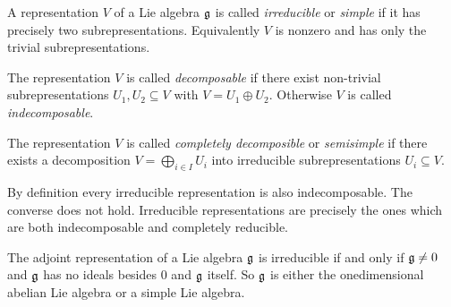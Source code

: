 \begin{defi}
 A representation $V$ of a Lie algebra $\mathfrak{g}$ is called \emph{irreducible} or \emph{simple} if it has precisely two subrepresentations. Equivalently $V$ is nonzero and has only the trivial subrepresentations.
 
 The representation $V$ is called \emph{decomposable} if there exist non-trivial subrepresentations $U_1, U_2 \subseteq V$ with $V = U_1 \oplus U_2$. Otherwise $V$ is called \emph{indecomposable}.
 
 The representation $V$ is called \emph{completely decomposible} or \emph{semisimple} if there exists a decomposition $V = \bigoplus_{i \in I} U_i$ into irreducible subrepresentations $U_i \subseteq V$.
\end{defi}


\begin{rem}
 By definition every irreducible representation is also indecomposable. The converse does not hold. Irreducible representations are precisely the ones which are both indecomposable and completely reducible.
\end{rem}


\begin{expl}
 The adjoint representation of a Lie algebra $\mathfrak{g}$ is irreducible if and only if $\mathfrak{g} \neq 0$ and $\mathfrak{g}$ has no ideals besides $0$ and $\mathfrak{g}$ itself. So $\mathfrak{g}$ is either the onedimensional abelian Lie algebra or a simple Lie algebra.
\end{expl}